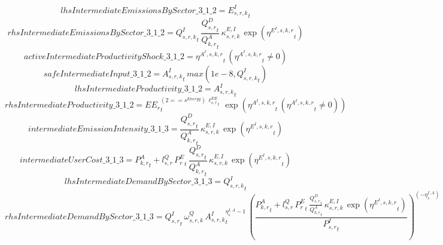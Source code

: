 \begin{dmath*}
lhsIntermediateEmissionsBySector\_3\_1\_2 = {{E^I_{s,r,k}}}_{t}
\end{dmath*}
\begin{dmath*}
rhsIntermediateEmissionsBySector\_3\_1\_2 = {{Q^{I}_{s,r,k}}}_{t}\, \frac{{{Q^{D}_{s,r}}}_{t}}{{{Q^{A}_{k,r}}}_{t}}\, {{\kappa^{E,I}_{s,r,k}}}\, \exp\left({{\eta^{E^{I},s,k,r}}}_{t}\right)
\end{dmath*}
\begin{dmath*}
activeIntermediateProductivityShock\_3\_1\_2 = {{\eta^{A^{I},s,k,r}}}_{t}\, \left({{\eta^{A^{I},s,k,r}}}_{t}\neq 0\right)
\end{dmath*}
\begin{dmath*}
safeIntermediateInput\_3\_1\_2 = {{A^{I}_{s,r,k}}}_{t}\, max(1e-8,{{Q^{I}_{s,r,k}}}_{t})
\end{dmath*}
\begin{dmath*}
lhsIntermediateProductivity\_3\_1\_2 = {{A^{I}_{s,r,k}}}_{t}
\end{dmath*}
\begin{dmath*}
rhsIntermediateProductivity\_3\_1\_2 = {{EE_r}}_{t}^{\left(2=={{s^{Energy}}}\right)\, {{\ell^{EE}_{s,r}}}_{t}}\, \exp\left({{\eta^{A^{I},s,k,r}}}_{t}\, \left({{\eta^{A^{I},s,k,r}}}_{t}\neq 0\right)\right)
\end{dmath*}
\begin{dmath*}
intermediateEmissionIntensity\_3\_1\_3 = \frac{{{Q^{D}_{s,r}}}_{t}}{{{Q^{A}_{k,r}}}_{t}}\, {{\kappa^{E,I}_{s,r,k}}}\, \exp\left({{\eta^{E^{I},s,k,r}}}_{t}\right)
\end{dmath*}
\begin{dmath*}
intermediateUserCost\_3\_1\_3 = {{P^{A}_{k,r}}}_{t}+{{l^{Q}_{s,r}}}\, {{P^E_r}}_{t}\, \frac{{{Q^{D}_{s,r}}}_{t}}{{{Q^{A}_{k,r}}}_{t}}\, {{\kappa^{E,I}_{s,r,k}}}\, \exp\left({{\eta^{E^{I},s,k,r}}}_{t}\right)
\end{dmath*}
\begin{dmath*}
lhsIntermediateDemandBySector\_3\_1\_3 = {{Q^{I}_{s,r,k}}}_{t}
\end{dmath*}
\begin{dmath*}
rhsIntermediateDemandBySector\_3\_1\_3 = {{Q^{I}_{s,r}}}_{t}\, {{\omega^{Q}_{s,r,k}}}\, {{A^{I}_{s,r,k}}}_{t}^{{{\eta^{I,A}_{s}}}-1}\, \left(\frac{{{P^{A}_{k,r}}}_{t}+{{l^{Q}_{s,r}}}\, {{P^E_r}}_{t}\, \frac{{{Q^{D}_{s,r}}}_{t}}{{{Q^{A}_{k,r}}}_{t}}\, {{\kappa^{E,I}_{s,r,k}}}\, \exp\left({{\eta^{E^{I},s,k,r}}}_{t}\right)}{{{P^{I}_{s,r}}}_{t}}\right)^{\left(-{{\eta^{I,A}_{s}}}\right)}
\end{dmath*}
